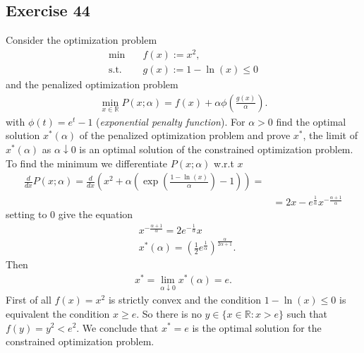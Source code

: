 \subsection{Exercise 44}
Consider the optimization problem
\begin{align}
    \text{min}\quad &f(x) := x^{2},\\
    \text{s.t.}\quad & g(x) := 1-\ln(x)\le 0 \nonumber
\end{align}
and the penalized optimization problem
\begin{align}
    \min_{x\in\mathbb{R}} P(x;\alpha) = f(x) + \alpha \phi\left(
    \frac{g(x)}{\alpha} \right).
\end{align}
with $\phi(t) = e^{t} -1$ (\textit{exponential penalty function}). For
$\alpha >0$ find the optimal solution $x^{*}\left( \alpha \right)$ of the
penalized optimization problem and prove $ x^{*}$, the limit of
$x^{*}(\alpha)$ as $\alpha \downarrow 0$ is an optimal solution of the
constrained optimization problem.
\newline
To find the minimum we differentiate $P(x;\alpha)$ w.r.t $x$
\begin{align}
    \frac{d}{dx}P(x;\alpha) = \frac{d}{dx}\left( x^{2} + \alpha\left(
    \exp\left( \frac{1-\ln(x)}{\alpha} \right)  -1 \right)  \right) =\\
    &= 2x - e^{\frac{1}{\alpha}}x^{-\frac{\alpha+1}{\alpha}}
\end{align}
setting to $0$ give the equation
\begin{align}
    &x^{-\frac{\alpha+1}{\alpha}} = 2e^{-\frac{1}{\alpha}}x\\
    &x^{*}(\alpha) = \left( \frac{1}{2}e^{\frac{1}{\alpha}}
    \right)^{\frac{\alpha}{2\alpha+1} }.
\end{align}
Then
\begin{align}
    x^{*} = \lim_{\alpha \downarrow 0}x^{*}(\alpha) = e.
\end{align}
First of all $f(x) = x^{2}$ is strictly convex and the condition $1-\ln(x)\le
0$ is equivalent the condition $x \ge e$. So there is no $y \in \{x\in
\mathbb{R}: x > e\}$ such that $f(y) = y^2 < e^2$. We conclude that $x^{*}=e$
is the optimal solution for the constrained optimization problem.
